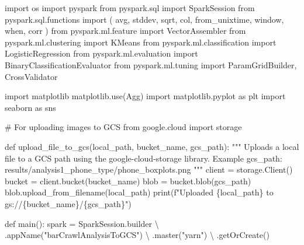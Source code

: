 \documentclass[
  letterpaper,
  DIV=11,
  numbers=noendperiod]{scrartcl}
\newenvironment{Shaded}{\begin{snugshade}}{\end{snugshade}}
\newcommand{\BuiltInTok}[1]{\textcolor[rgb]{0.98,0.46,0.51}{#1}}
\newcommand{\CommentTok}[1]{\textcolor[rgb]{0.42,0.45,0.49}{#1}}
\newcommand{\ImportTok}[1]{\textcolor[rgb]{0.62,0.80,1.00}{#1}}
\newcommand{\KeywordTok}[1]{\textcolor[rgb]{0.98,0.46,0.51}{#1}}
\newcommand{\NormalTok}[1]{\textcolor[rgb]{0.88,0.89,0.91}{#1}}
\newcommand{\OperatorTok}[1]{\textcolor[rgb]{0.88,0.89,0.91}{#1}}
\newcommand{\SpecialCharTok}[1]{\textcolor[rgb]{0.47,0.72,1.00}{#1}}
\newcommand{\SpecialStringTok}[1]{\textcolor[rgb]{0.62,0.80,1.00}{#1}}
\newcommand{\StringTok}[1]{\textcolor[rgb]{0.62,0.80,1.00}{#1}}
\begin{document}
\begin{Shaded}
\begin{Highlighting}[]
\ImportTok{import}\NormalTok{ os}
\ImportTok{import}\NormalTok{ pyspark}
\ImportTok{from}\NormalTok{ pyspark.sql }\ImportTok{import}\NormalTok{ SparkSession}
\ImportTok{from}\NormalTok{ pyspark.sql.functions }\ImportTok{import}\NormalTok{ (}
\NormalTok{    avg, stddev, sqrt, col, from\_unixtime, window, when, corr}
\NormalTok{)}
\ImportTok{from}\NormalTok{ pyspark.ml.feature }\ImportTok{import}\NormalTok{ VectorAssembler}
\ImportTok{from}\NormalTok{ pyspark.ml.clustering }\ImportTok{import}\NormalTok{ KMeans}
\ImportTok{from}\NormalTok{ pyspark.ml.classification }\ImportTok{import}\NormalTok{ LogisticRegression}
\ImportTok{from}\NormalTok{ pyspark.ml.evaluation }\ImportTok{import}\NormalTok{ BinaryClassificationEvaluator}
\ImportTok{from}\NormalTok{ pyspark.ml.tuning }\ImportTok{import}\NormalTok{ ParamGridBuilder, CrossValidator}

\ImportTok{import}\NormalTok{ matplotlib}
\NormalTok{matplotlib.use(}\StringTok{\textquotesingle{}Agg\textquotesingle{}}\NormalTok{)}
\ImportTok{import}\NormalTok{ matplotlib.pyplot }\ImportTok{as}\NormalTok{ plt}
\ImportTok{import}\NormalTok{ seaborn }\ImportTok{as}\NormalTok{ sns}

\CommentTok{\# For uploading images to GCS}
\ImportTok{from}\NormalTok{ google.cloud }\ImportTok{import}\NormalTok{ storage}

\KeywordTok{def}\NormalTok{ upload\_file\_to\_gcs(local\_path, bucket\_name, gcs\_path):}
    \CommentTok{"""}
\CommentTok{    Uploads a local file to a GCS path using the google{-}cloud{-}storage library.}
\CommentTok{    Example gcs\_path: \textquotesingle{}results/analysis1\_phone\_type/phone\_boxplots.png\textquotesingle{}}
\CommentTok{    """}
\NormalTok{    client }\OperatorTok{=}\NormalTok{ storage.Client()}
\NormalTok{    bucket }\OperatorTok{=}\NormalTok{ client.bucket(bucket\_name)}
\NormalTok{    blob }\OperatorTok{=}\NormalTok{ bucket.blob(gcs\_path)}
\NormalTok{    blob.upload\_from\_filename(local\_path)}
    \BuiltInTok{print}\NormalTok{(}\SpecialStringTok{f"Uploaded }\SpecialCharTok{\{}\NormalTok{local\_path}\SpecialCharTok{\}}\SpecialStringTok{ to gs://}\SpecialCharTok{\{}\NormalTok{bucket\_name}\SpecialCharTok{\}}\SpecialStringTok{/}\SpecialCharTok{\{}\NormalTok{gcs\_path}\SpecialCharTok{\}}\SpecialStringTok{"}\NormalTok{)}

\KeywordTok{def}\NormalTok{ main():}
\NormalTok{    spark }\OperatorTok{=}\NormalTok{ SparkSession.builder }\OperatorTok{\textbackslash{}}
\NormalTok{        .appName(}\StringTok{"barCrawlAnalysisToGCS"}\NormalTok{) }\OperatorTok{\textbackslash{}}
\NormalTok{        .master(}\StringTok{"yarn"}\NormalTok{) }\OperatorTok{\textbackslash{}}
\NormalTok{        .getOrCreate()}


\end{Highlighting}
\end{Shaded}
\end{document}
